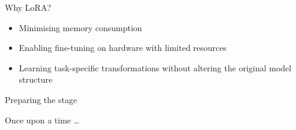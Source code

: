 \documentclass[aspectratio=169]{beamer}
\begin{document}
\note{ }

\begin{frame}{Why LoRA?}

  \begin{itemize}
    \setlength\itemsep{1em}
    \item Minimising  memory consumption
    \item Enabling fine-tuning on hardware with limited resources
    \item Learning task-specific transformations without altering the original model structure
  \end{itemize}

\end{frame}

\note{ }


\begin{frame}{Preparing the stage}

  \begin{center}
    \Huge \color[rgb]{1,1,1}Once upon a time \dots
  \end{center}

\end{frame}
\end{document}
